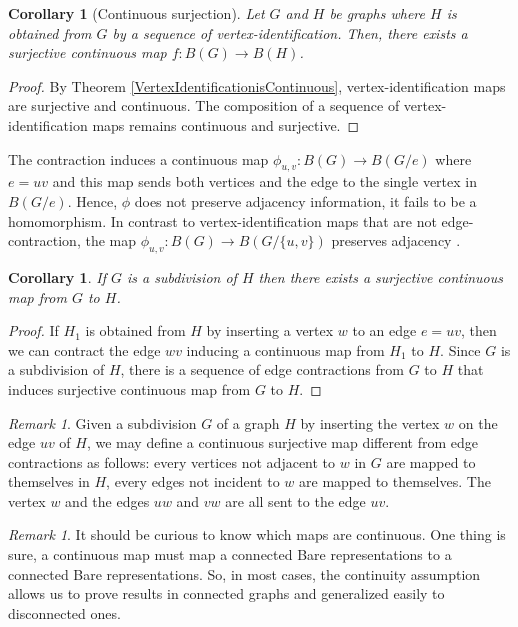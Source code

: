 \documentclass{amsart}
\newtheorem{corollary}[theorem]{Corollary}
\theoremstyle{definition}
\theoremstyle{remark}
\newtheorem{remark}[theorem]{Remark}
\numberwithin{equation}{section}
\begin{document}
	\begin{corollary}[Continuous surjection]
		Let \( G \) and \( H \) be graphs where \( H \) is obtained from \( G \) by a	sequence of vertex-identification. Then, there exists a surjective continuous map \(f: B(G) \to B(H)\).
	\end{corollary}
	
	\begin{proof}
		By Theorem \ref{VertexIdentificationisContinuous}, vertex-identification maps are surjective and continuous. The composition of a sequence of vertex-identification maps remains continuous and surjective.
	\end{proof}
	
	The contraction induces a continuous map \(\phi_{u,v}: B(G) \to B(G/e)\) where \(e=uv\) and this map sends both vertices and the edge to the single vertex in \( B(G/e) \). Hence, \(\phi\) does not preserve adjacency information, it fails to be a homomorphism. In contrast to vertex-identification maps that are not edge-contraction, the map \(\phi_{u,v}: B(G) \to B(G/\{u,v\})\) preserves adjacency	.
	
	\begin{corollary}
		If \(G\) is a subdivision of \(H\) then there exists a surjective continuous map from \(G\) to \(H\).
	\end{corollary}
	\begin{proof}
		If \(H_1\) is obtained from \(H\) by inserting a vertex \(w\) to an edge \(e=uv\), then we can contract the edge \(wv\) inducing a continuous map from \(H_1\) to \(H\). Since \(G\) is a subdivision of \(H\), there is a sequence of edge contractions from \(G\) to \(H\) that induces surjective continuous map from \(G\) to \(H\).
	\end{proof}
	
	\begin{remark}
		Given a subdivision \(G\) of a graph \(H\) by inserting the vertex \(w\) on the edge \(uv\) of \(H\), we may define a continuous surjective map different from edge contractions as follows: every vertices not adjacent to \(w\) in \(G\) are mapped to themselves in \(H\), every edges not incident to \(w\) are mapped to themselves. The vertex \(w\) and the edges \(uw\) and \(vw\) are all sent to the edge \(uv\).
	\end{remark}
	
	\begin{remark}
		It should be curious to know which maps are continuous. One thing is sure, a continuous map must map a connected Bare representations to a connected Bare representations. So, in most cases, the continuity assumption allows us to prove results in connected graphs and generalized easily to disconnected ones.
	\end{remark}
	
\end{document}
